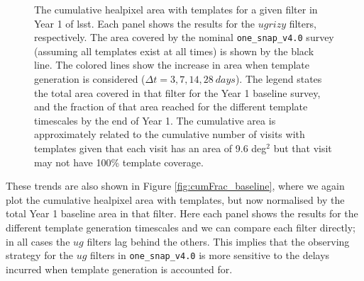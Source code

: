 \documentclass[preprintm,linenumbers]{aastex631}
\newcommand{\baseline}{\texttt{one\_snap\_v4.0}\xspace}
\begin{document}
\begin{figure}
			\caption{The cumulative healpixel area with templates for a given filter in Year 1 of \gls*{lsst}.
				Each panel shows the results for the $ugrizy$ filters, respectively.
				The area covered by the nominal \baseline survey (assuming all templates exist at all times) is shown by the black line.
				The colored lines show the increase in area when template generation is considered ($\Delta t = 3, 7, 14, 28\ \si{days}$).
				The legend states the total area covered in that filter for the Year 1 baseline survey, and the fraction of that area reached for the different template timescales by the end of Year 1.
				The cumulative area is approximately related to the cumulative number of visits with templates given that each visit has an area of 9.6 deg$^2$ but that visit may not have 100\% template coverage.
    }
			\label{fig:cum_baseline_filter}
			
		\end{figure}
  
		These trends are also shown in Figure \ref{fig:cumFrac_baseline}, where we again plot the cumulative healpixel area with templates,  but now normalised by the total Year 1 baseline area in that filter.
		Here each panel shows the results for the different template generation timescales and we can compare each filter directly; in all cases the $ug$ filters lag behind the others.
		This implies that the observing strategy for the $ug$ filters in \baseline is more sensitive to the delays incurred when template generation is accounted for.
\end{document}
